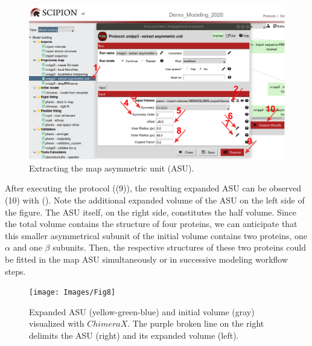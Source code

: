  \begin{figure}[H]
  \centering 
  \captionsetup{width=.9\linewidth} 
  \includegraphics[width=1\textwidth]
  {Images/Fig7}
  \caption{Extracting the map asymmetric unit (ASU).}
  \label{fig:extract_unit_cell}
  \end{figure}
  
After executing the protocol ((9)), the resulting expanded ASU can be observed (10) with \chimera (). Note the additional expanded volume of the  ASU on the left side of the figure. The ASU itself, on the right side, constitutes the half volume. Since the total volume contains the structure of four proteins, we can anticipate that this smaller asymmetrical subunit of the initial volume contains two proteins, one $\alpha$ and one $\beta$  subunits. Then, the respective structures of these two proteins could be fitted in the map ASU simultaneously or in successive modeling workflow steps. 
  
 \begin{figure}[H]
  \centering 
  \captionsetup{width=.7\linewidth} 
  \texttt{[image: Images/Fig8]}
  \caption{Expanded ASU (yellow-green-blue) and initial volume (gray) visualized with $ChimeraX$. The purple broken line on the right delimits the ASU (right) and its expanded volume (left).}
  \label{fig:chimera_visualization_unit_cell}
  \end{figure}
